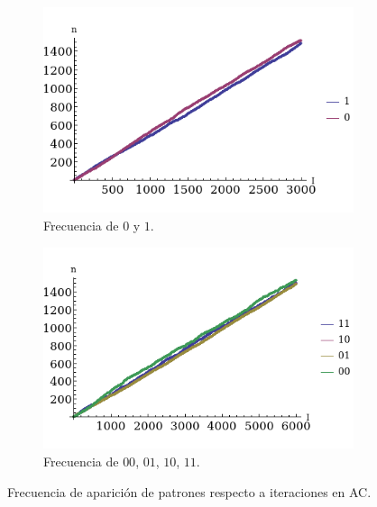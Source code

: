 \documentclass[letterpaper,11pt]{article}
\begin{document}
\begin{figure}[h!]
\begin{subfigure}{.5\textwidth}
	\centering
	\includegraphics[scale=0.55]{img/AC_Grupo1}
	\caption{Frecuencia de $0$ y $1$.}
\end{subfigure}%
\begin{subfigure}{.5\textwidth}
	\centering
	\includegraphics[scale=0.55]{img/AC_Grupo2}
	\caption{Frecuencia de $00$, $01$, $10$, $11$.}
\end{subfigure}%
\caption{Frecuencia de aparición de patrones respecto a iteraciones en AC.}
\label{fig:acpat1}
\end{figure}
\end{document}
